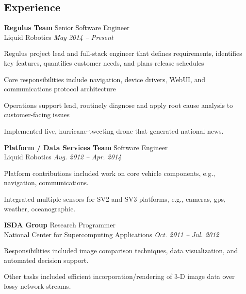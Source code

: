\documentclass[margin, line]{resume}
\begin{document}
\begin{resume}
    \section{\mysidestyle Experience}
   
    \textbf{Regulus Team} \hfill Senior Software Engineer\\  
    Liquid Robotics \hfill \textsl{May 2014 -- Present} \\
    \vspace{ -2 mm}
    \begin{list2}
        \item Regulus project lead and full-stack engineer that defines requirements, identifies key features, quantifies customer needs, and plans release schedules
        \item Core responsibilities include navigation, device drivers, WebUI, and communications protocol architecture
        \item Operations support lead, routinely diagnose and apply root cause analysis to customer-facing issues
        \item Implemented live, hurricane-tweeting drone that generated national news.
    \end{list2}\vspace{-2mm}

    \textbf{Platform / Data Services Team} \hfill Software Engineer\\  
    Liquid Robotics \hfill \textsl{Aug. 2012 -- Apr. 2014} \\
    \vspace{ -2 mm}
    \begin{list2}
        \item Platform contributions included work on core vehicle components, e.g., navigation, communications.
        \item Integrated multiple sensors for SV2 and SV3 platforms, e.g., cameras, gps, weather, oceanographic.
    \end{list2}\vspace{-2mm}

    \textbf{ISDA Group} \hfill Research Programmer\\  
    National Center for Supercomputing Applications \hfill \textsl{Oct. 2011 -- Jul. 2012} \\
    \vspace{ -2 mm}
    \begin{list2}
        \item Responsibilities included image comparison techniques, data visualization, and automated decision support. 
        \item Other tasks included efficient incorporation/rendering of 3-D image data over lossy network streams.  
    \end{list2}\vspace{-2mm}
   

\end{resume}
\end{document}

